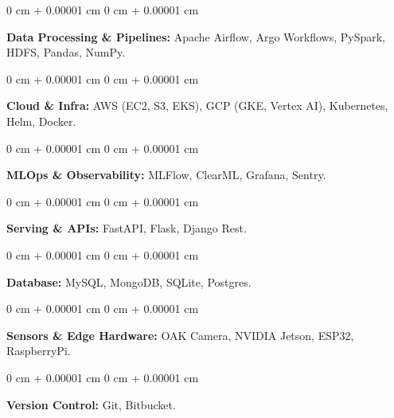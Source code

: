 \documentclass[10pt, letterpaper]{article}
\newenvironment{onecolentry}{
    \begin{adjustwidth}{
        0 cm + 0.00001 cm
    }{
        0 cm + 0.00001 cm
    }
}{
    \end{adjustwidth}
} %
\begin{document}
        \begin{onecolentry}
            \textbf{Data Processing \& Pipelines:} Apache Airflow, Argo Workflows, PySpark, HDFS, Pandas, NumPy.
        \end{onecolentry}

        \vspace{0.05 cm}

        \begin{onecolentry}
            \textbf{Cloud \& Infra:} AWS (EC2, S3, EKS), GCP (GKE, Vertex AI), Kubernetes, Helm, Docker.
        \end{onecolentry}

        \vspace{0.05 cm}

        \begin{onecolentry}
            \textbf{MLOps \& Observability:} MLFlow, ClearML, Grafana, Sentry.
        \end{onecolentry}

        \vspace{0.05 cm}

         \begin{onecolentry}
            \textbf{Serving \& APIs:} FastAPI, Flask, Django Rest.
        \end{onecolentry}

        \vspace{0.05 cm}

         \begin{onecolentry}
            \textbf{Database:} MySQL, MongoDB, SQLite, Postgres.
        \end{onecolentry}

    \vspace{0.05 cm}

         \begin{onecolentry}
            \textbf{Sensors \& Edge Hardware:} OAK Camera, NVIDIA Jetson, ESP32, RaspberryPi.
        \end{onecolentry}
\vspace{0.05 cm}

        \begin{onecolentry}
            \textbf{Version Control:} Git, Bitbucket.
        \end{onecolentry}
    
\end{document}
